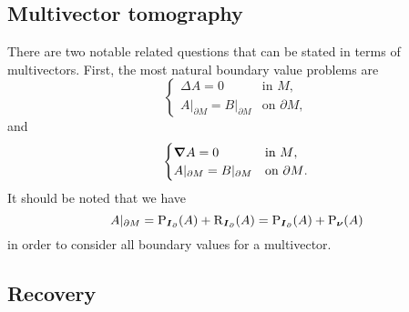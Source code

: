 \subsection{Multivector tomography}

There are two notable related questions that can be stated in terms of multivectors. First, the most natural boundary value problems are 
\begin{equation}
\label{eq:multivector_harmonic_bvp}
\begin{cases}
\Delta A = 0 & \textrm{in $M$},\\
A\vert_{\partial M} = B\vert_{\partial M} & \textrm{on $\partial M$},
\end{cases}
\end{equation}
and
\begin{equation}
\label{eq:multivector_monogenic_bvp}
\begin{cases}
\boldsymbol{\nabla} A = 0 & \textrm{in $M$},\\
A\vert_{\partial M} = B\vert_{\partial M} & \textrm{on $\partial M$}.
\end{cases}
\end{equation}
It should be noted that we have
\begin{equation}
A\vert_{\partial M} = \operatorname{P}_{\boldsymbol{I}_\partial}(A) + \operatorname{R}_{\boldsymbol{I}_\partial}(A) = \operatorname{P}_{\boldsymbol{I}_\partial}(A) + \operatorname{P}_{\boldsymbol{\nu}}(A)
\end{equation}
in order to consider all boundary values for a multivector. 


\subsection{Recovery}

